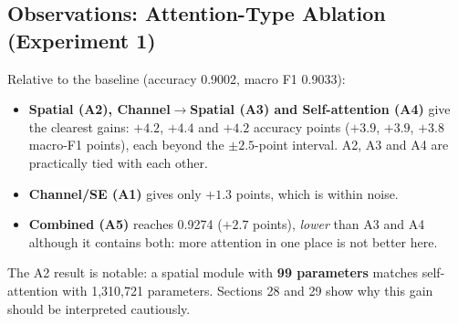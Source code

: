\documentclass[10pt]{article}
\begin{document}
\subsection*{Observations: Attention-Type Ablation (Experiment 1)}
\begin{table}[H]
\centering
\caption{Experiment 1 -- attention-type ablation at $P_3$ (test split, 551 images).}
\scriptsize
{}
\end{table}

Relative to the baseline (accuracy 0.9002, macro F1 0.9033):
\begin{itemize}
\item \textbf{Spatial (A2), Channel$\to$Spatial (A3) and Self-attention (A4)} give the clearest gains: $+4.2$, $+4.4$ and $+4.2$ accuracy points ($+3.9$, $+3.9$, $+3.8$ macro-F1 points), each beyond the $\pm2.5$-point interval. A2, A3 and A4 are practically tied with each other.
\item \textbf{Channel/SE (A1)} gives only $+1.3$ points, which is within noise.
\item \textbf{Combined (A5)} reaches 0.9274 ($+2.7$ points), \emph{lower} than A3 and A4 although it contains both: more attention in one place is not better here.
\end{itemize}
The A2 result is notable: a spatial module with \textbf{99 parameters} matches self-attention with 1{,}310{,}721 parameters. Sections 28 and 29 show why this gain should be interpreted cautiously.
\end{document}
